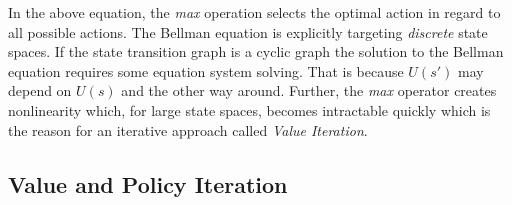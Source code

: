 In the above equation, the \emph{max} operation selects the optimal action in regard to all possible actions. The
Bellman equation is explicitly targeting \emph{discrete} state spaces. If the state transition graph is a cyclic graph
the solution to the Bellman equation requires some equation system solving. That is because $U(s')$ may depend on $U(s)$
and the other way around. Further, the \emph{max} operator creates nonlinearity which, for large state spaces, becomes 
intractable quickly which is the reason for an iterative approach called \emph{Value Iteration}.







\subsection{Value and Policy Iteration}%
\label{sub:policy_and_value_iteration}

